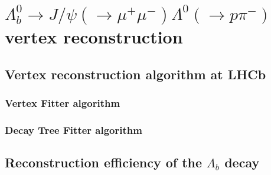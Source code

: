 \chapter{\texorpdfstring{$\Lambda_b^0 \rightarrow J/\psi (\rightarrow \mu^+ \mu^-) \Lambda^0 (\rightarrow p\pi^-)$}{Lambdab to JPsi Lambda} vertex reconstruction}
\label{cap:vertex_reconstruction}

\section{Vertex reconstruction algorithm at LHCb}
\subsection{Vertex Fitter algorithm}
\subsection{Decay Tree Fitter algorithm}

\section{Reconstruction efficiency of the \texorpdfstring{$\Lambda_b$}{Lambdab} decay}
